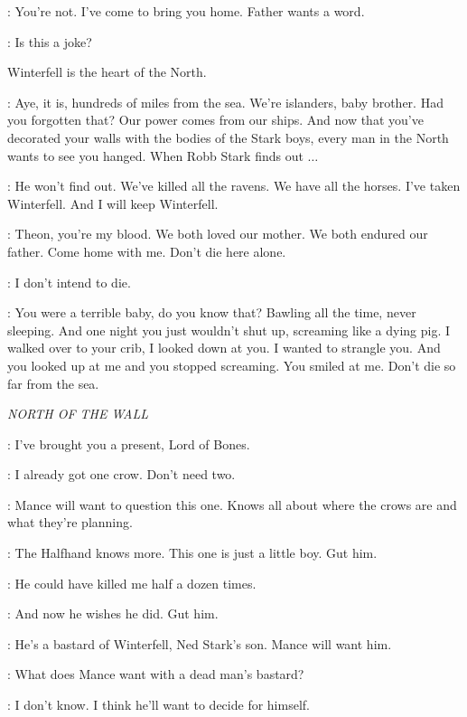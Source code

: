 \YARA: You're not. I've come to bring you home. Father wants a word. 

\THEON: Is this a joke? 

Winterfell is the heart of the North. 

\YARA: Aye, it is, hundreds of miles from the sea. We're islanders, baby brother. Had you forgotten that? Our power comes from our ships. And now that you've decorated your walls with the bodies of the Stark boys, every man in the North wants to see you hanged. When Robb Stark finds out $\ldots$  

\THEON: He won't find out. We've killed all the ravens. We have all the horses. I've taken Winterfell. And I will keep Winterfell. 

\YARA: Theon, you're my blood. We both loved our mother. We both endured our father. Come home with me. Don't die here alone. 

\THEON: I don't intend to die. 

\YARA: You were a terrible baby, do you know that? Bawling all the time, never sleeping. And one night you just wouldn't shut up, screaming like a dying pig. I walked over to your crib, I looked down at you. I wanted to strangle you. And you looked up at me and you stopped screaming. You smiled at me. Don't die so far from the sea. 


\scene

\textit{NORTH OF THE WALL} 


\YGRITTE: I've brought you a present, Lord of Bones. 

\LORDOFBONES: I already got one crow. Don't need two. 

\YGRITTE: Mance will want to question this one. Knows all about where the crows are and what they're planning. 

\LORDOFBONES: The Halfhand knows more. This one is just a little boy. Gut him. 

\YGRITTE: He could have killed me half a dozen times. 

\LORDOFBONES: And now he wishes he did. Gut him. 

\YGRITTE: He's a bastard of Winterfell, Ned Stark's son. Mance will want him. 

\LORDOFBONES: What does Mance want with a dead man's bastard? 

\YGRITTE: I don't know. I think he'll want to decide for himself. 

